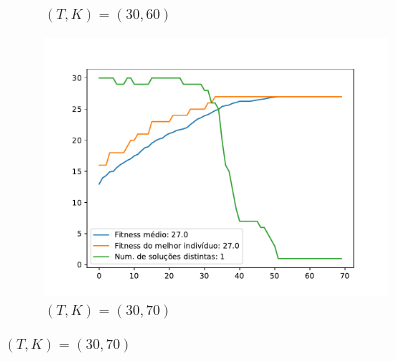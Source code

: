 \documentclass[11pt,a4paper]{article}
\begin{document}
\begin{figure}[!hb]
\begin{subfigure}[b]{0.33\textwidth}
		\caption{$(T,K)=(30,60)$}
	\end{subfigure}%
	\begin{subfigure}[b]{0.33\textwidth}
		\centering
		\includegraphics[width=\textwidth]{teste6_30_70.pdf}
		\caption{$(T,K)=(30,70)$}
	\end{subfigure}%
	

\end{figure}
\end{document}
